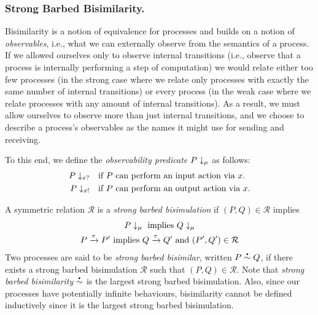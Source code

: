 \subsubsection{Strong Barbed Bisimilarity.}
Bisimilarity is a notion of equivalence for processes and
builds on a notion of \emph{observables}, i.e., what we can externally
observe from the semantics of a process. If we allowed ourselves only to observe
internal transitions (i.e., observe that a process is internally
performing a step of computation) we would relate either too few
processes (in the strong case where we relate only processes with
exactly the same number of internal transitions) or every process (in
the weak case where we relate processes with any amount of internal
transitions).  As a result, we must allow ourselves to observe more than
just internal transitions, and we choose to describe a process's observables
as the names it might use for sending and receiving.

To this end, we define the \emph{observability predicate}
\( P\downarrow_{\mu} \) as follows:
\begin{align*}
  P\downarrow_{x?}  &\quad \textrm{if \( P \) can perform an input action via \( x \).} \\
  P\downarrow_{x!} &\quad \textrm{if \( P \) can perform an output action via \( x \).}
\end{align*}

A symmetric relation $\mathcal R$ is a {\em strong barbed
  bisimulation} if $(P,Q)\in\mathcal R$ implies
\begin{gather}
  P\downarrow_{\mu}~\textrm{implies}~Q\downarrow_{\mu}\label{eq:bisim1} \\
  P \xrightarrow{\tau} P'~\textrm{implies}~Q \xrightarrow{\tau} Q'~\textrm{and}~
  (P',Q')\in\mathcal R\label{eq:bisim2}
\end{gather}
%
Two processes are said to be \emph{strong barbed bisimilar}, written
\( P\sbbisim{}{}Q \), if there exists a strong barbed bisimulation
$\mathcal R$ such that $(P,Q)\in\mathcal R$. Note that {\em strong
  barbed bisimilarity} \( \sbbisim{}{} \) is the largest strong barbed
bisimulation.
Also, since our processes have potentially infinite behaviours,
bisimilarity cannot be defined inductively since it is the largest
strong barbed bisimulation.


